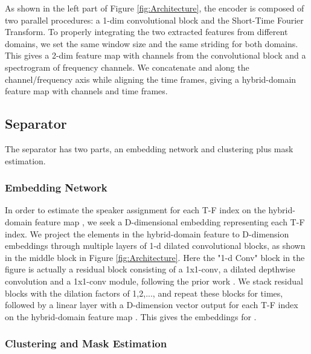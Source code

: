 \documentclass[a4paper]{article}
\begin{document}
As shown in the left part of Figure \ref{fig:Architecture}, the encoder is composed of two parallel procedures: a 1-dim convolutional block and the Short-Time Fourier Transform. To properly integrating the two extracted features from different domains, we set the same window size and the same striding for both domains. This gives a 2-dim feature map  with  channels from the convolutional block and a spectrogram  of  frequency channels. We concatenate  and  along the channel/frequency axis while aligning the time frames, giving a hybrid-domain feature map  with  channels and  time frames. 


\subsection{Separator}

The separator has two parts, an embedding network and clustering plus mask estimation.

\subsubsection{Embedding Network}

In order to estimate the speaker assignment for each T-F index on the hybrid-domain feature map , we seek a D-dimensional embedding representing each T-F index. We project the elements in the hybrid-domain feature  to D-dimension embeddings through multiple layers of 1-d dilated convolutional blocks, as shown in the middle block in Figure \ref{fig:Architecture}. Here the "1-d Conv" block in the figure is actually a residual block consisting of a 1x1-conv, a dilated depthwise convolution and a 1x1-conv module, following the prior work \cite{luo2018tasnet}. We stack  residual blocks with the dilation factors of 1,2,..., and repeat these blocks for  times, followed by a linear layer with a D-dimension vector output for each T-F index on the hybrid-domain feature map . This gives the embeddings  for . 

\subsubsection{Clustering and Mask Estimation}
\end{document}
